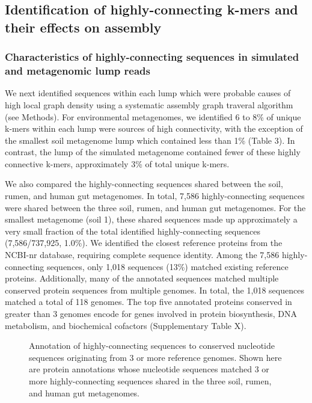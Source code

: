 \documentclass[11pt]{article} %
\begin{document}
\subsection{Identification of highly-connecting k-mers and their effects on assembly}

\subsubsection{Characteristics of highly-connecting sequences in simulated and metagenomic lump reads}

We next identified sequences within each lump which were probable causes of high local graph density using a systematic assembly graph traveral algorithm (see Methods).  For environmental metagenomes, we identified 6 to 8\% of unique k-mers within each lump were sources of high connectivity, with the exception of the smallest soil metagenome lump which contained less than 1\%  (Table 3).  In contrast, the lump of the simulated metagenome contained fewer of these highly connective k-mers, approximately 3\% of total unique k-mers.  

We also compared the highly-connecting sequences shared between the soil, rumen, and human gut metagenomes.  In total, 7,586 highly-connecting sequences were shared between the three soil, rumen, and human gut metagenomes.  For the smallest metagenome (soil 1), these shared sequences made up approximately a very small fraction of the total identified highly-connecting sequences (7,586/737,925, 1.0\%).   We identified the closest reference proteins from the NCBI-nr database, requiring complete sequence identity.  Among the 7,586 highly-connecting sequences, only 1,018 sequences (13\%) matched existing reference proteins.  Additionally, many of the annotated sequences matched multiple conserved protein sequences from multiple genomes.  In total, the 1,018 sequences matched a total of 118 genomes.  The top five annotated proteins conserved in greater than 3 genomes encode for genes involved in protein biosynthesis, DNA metabolism, and biochemical cofactors (Supplementary Table X).

\begin{figure}
\caption{Annotation of highly-connecting sequences to conserved nucleotide sequences originating from 3 or more reference genomes.  Shown here are protein annotations whose nucleotide sequences matched 3 or more highly-connecting sequences shared in the three soil, rumen, and human gut metagenomes.}
\end{figure}
\end{document}
